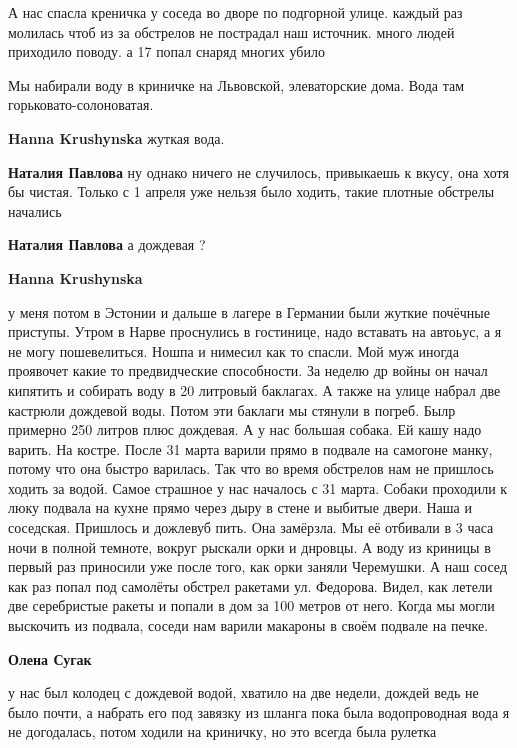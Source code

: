 
А нас спасла креничка у соседа во дворе по подгорной улице. каждый раз молилась
чтоб из за обстрелов не пострадал наш источник. много людей приходило поводу. а
17 попал снаряд многих убило


Мы набирали воду в криничке на Львовской, элеваторские дома. Вода там
горьковато-солоноватая.

\begin{itemize} %
\textbf{Hanna Krushynska} жуткая вода.

\textbf{Наталия Павлова} ну однако ничего не случилось, привыкаешь к вкусу, она хотя бы чистая. Только с 1 апреля уже нельзя было ходить, такие плотные обстрелы начались

\textbf{Наталия Павлова} а дождевая ?

\textbf{Hanna Krushynska} 

у меня потом в Эстонии и дальше в лагере в Германии были жуткие почёчные
приступы. Утром в Нарве проснулись в гостинице, надо вставать на автоьус, а я
не могу пошевелиться. Ношпа и нимесил как то спасли. Мой муж иногда проявочет
какие то предвидческие способности. За неделю др войны он начал кипятить и
собирать воду в 20 литровый баклагах. А также на улице набрал две кастрюли
дождевой воды. Потом эти баклаги мы стянули в погреб. Былр примерно 250 литров
плюс дождевая. А у нас большая собака. Ей кашу надо варить. На костре. После 31
марта варили прямо в подвале на самогоне манку, потому что она быстро варилась.
Так что во время обстрелов нам не пришлось ходить за водой. Самое страшное у
нас началось с 31 марта. Собаки проходили к люку подвала на кухне прямо через
дыру в стене и выбитые двери. Наша и соседская. Пришлось и дожлевуб пить. Она
замёрзла. Мы её отбивали в 3 часа ночи в полной темноте, вокруг рыскали орки и
днровцы. А воду из криницы в первый раз приносили уже после того, как орки
заняли Черемушки. А наш сосед как раз попал под самолёты обстрел ракетами ул.
Федорова. Видел, как летели две серебристые ракеты и попали в дом за 100 метров
от него. Когда мы могли выскочить из подвала, соседи нам варили макароны в
своём подвале на печке.

\textbf{Олена Сугак} 

у нас был колодец с дождевой водой, хватило на две недели, дождей ведь не было
почти, а набрать его под завязку из шланга пока была водопроводная вода я не
догодалась, потом ходили на криничку, но это всегда была рулетка


\end{itemize}
